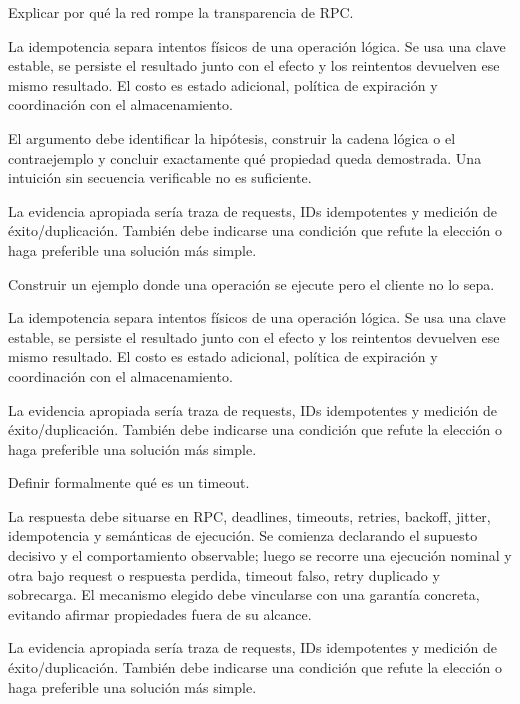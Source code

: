 \documentclass[variant=guia,cover=institutional,mode=screen]{ua-engineering-v6-article}
\begin{document}
\begin{uaexercise}
Explicar por qué la red rompe la transparencia de RPC.
\end{uaexercise}
\begin{uaanswer}
La idempotencia separa intentos físicos de una operación lógica. Se usa una clave estable, se persiste el resultado junto con el efecto y los reintentos devuelven ese mismo resultado. El costo es estado adicional, política de expiración y coordinación con el almacenamiento.

El argumento debe identificar la hipótesis, construir la cadena lógica o el contraejemplo y concluir exactamente qué propiedad queda demostrada. Una intuición sin secuencia verificable no es suficiente.

La evidencia apropiada sería traza de requests, IDs idempotentes y medición de éxito/duplicación. También debe indicarse una condición que refute la elección o haga preferible una solución más simple.
\end{uaanswer}

\begin{uaexercise}
Construir un ejemplo donde una operación se ejecute pero el cliente no lo sepa.
\end{uaexercise}
\begin{uaanswer}
La idempotencia separa intentos físicos de una operación lógica. Se usa una clave estable, se persiste el resultado junto con el efecto y los reintentos devuelven ese mismo resultado. El costo es estado adicional, política de expiración y coordinación con el almacenamiento.

La evidencia apropiada sería traza de requests, IDs idempotentes y medición de éxito/duplicación. También debe indicarse una condición que refute la elección o haga preferible una solución más simple.
\end{uaanswer}

\begin{uaexercise}
Definir formalmente qué es un timeout.
\end{uaexercise}
\begin{uaanswer}
La respuesta debe situarse en RPC, deadlines, timeouts, retries, backoff, jitter, idempotencia y semánticas de ejecución. Se comienza declarando el supuesto decisivo y el comportamiento observable; luego se recorre una ejecución nominal y otra bajo request o respuesta perdida, timeout falso, retry duplicado y sobrecarga. El mecanismo elegido debe vincularse con una garantía concreta, evitando afirmar propiedades fuera de su alcance.

La evidencia apropiada sería traza de requests, IDs idempotentes y medición de éxito/duplicación. También debe indicarse una condición que refute la elección o haga preferible una solución más simple.
\end{uaanswer}
\end{document}
